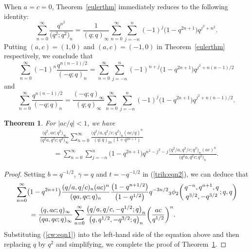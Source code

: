 \documentclass[pdftex]{sigma}
\numberwithin{equation}{section}
\newtheorem{Theorem}{Theorem}[section]
\begin{document}
When $a=c=0$, Theorem~\ref{eulerthm} immediately reduces to the following identity:
\begin{equation*}%
	\sum_{n=0}^\infty \frac {q^{n^2}}{\bigl(q^2; q^2\bigr)_n}
	=\frac{1}{(q; q)_\infty}
	\sum_{n=0}^\infty \sum_{j=-n}^n (-1)^j \bigl(1-q^{2n+1}\bigr) q^{j^2+n^2}.
\end{equation*}	
Putting $(a, c)=(1, 0)$ and $(a, c)=(-1, 0)$ in Theorem~\ref{eulerthm} respectively, we conclude that
\begin{equation*}%
	\sum_{n=0}^\infty (-1)^n \frac{q^{n(n-1)/2}}{(-q; q)_n}
	=\sum_{n=0}^\infty \sum_{j=-n}^n (-1)^{n+j} \bigl(1-q^{2n+1}\bigr) q^{j^2+n(n-1)/2}
\end{equation*}
and
\begin{equation*}%
	\sum_{n=0}^\infty \frac{q^{n(n-1)/2}}{(-q; q)_n}
	=\frac{(-q; q)_\infty}{(q; q)_\infty}\sum_{n=0}^\infty \sum_{j=-n}^n (-1)^{j} \bigl(1-q^{2n+1}\bigr) q^{j^2+n(n-1)/2}.
\end{equation*}

\begin{Theorem}\label{liuoldthm} For $|ac/q|<1$, we have
	\begin{align*}%
		&\frac{\bigl(q^2, ac; q^2\bigr)_\infty}{\bigl(q^2 a, q^2 c; q^2\bigr)_\infty}
		\sum_{n=0}^\infty \frac{\bigl(q^2/a, q^2/c; q^2\bigr)_n (ac/q)^n}{(q; q)_{2n} (1+q^{2n+1})}\\
		&\qquad{}=\sum_{n=0}^\infty \sum_{j=-n}^n \bigl(1-q^{2n+1}\bigr) q^{n^2-j^2-j}
		\frac{\bigl(q^2/a, q^2/c; q^2\bigr)_n (ac)^n}{\bigl(q^2 a, q^2 c; q^2\bigr)_n}.\nonumber
	\end{align*}
\end{Theorem}
\begin{proof} Setting $b=q^{-1/2}$, $\gamma=q$ and $t=-q^{-1/2}$ in (\ref{trih:eqn2}), we can deduce that
	\begin{align*}
		&\sum_{n=0}^\infty \bigl(1-q^{2n+1}\bigr)\frac{(q/a, q/c)_n (ac)^n}{(qa, qc; q)_n}
		\frac{\bigl(1-q^{n+1/2}\bigr)}{\bigl(1-q^{1/2}\bigr)} q^{-3n/2}{_3\phi_2}\biggl({{q^{-n}, q^{n+1}, q}\atop{q^{3/2}, -q^{3/2}}}; q, q\biggr)\\
		&\qquad =\frac{(q, ac; q)_\infty}{(qa, qc; q)_\infty}
		\sum_{n=0}^\infty \frac{\bigl(q/a, q/c, -q^{1/2}; q\bigr)_n}{\bigl(q, q^{1/2}, -q^{3/2}; q\bigr)_n}\biggl(\frac{ac}{q^{1/2}}\biggr)^n.
	\end{align*}
	Substituting (\ref{cw:eqn1}) into the left-hand side of the equation above and then replacing $q$ by $q^2$ and simplifying, we complete the proof of Theorem~\ref{liuoldthm}.
\end{proof}
\end{document}
